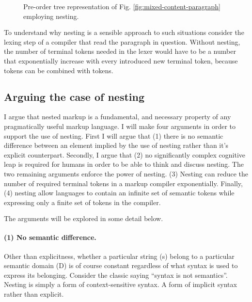 \documentclass{scrreprt}
\begin{document}
\begin{figure}[h]
  \centering

  \caption{Pre-order tree representation of Fig. \ref{fig:mixed-content-paragraph} employing nesting.}
  \label{fig:mixed-content-tree}
\end{figure}



To understand why nesting is a sensible approach to such situations consider the lexing step of a compiler that read the paragraph in question. Without nesting, the number of terminal tokens needed in the lexer would have to be a number that exponentially increase with every introduced new terminal token, because tokens can be combined with tokens.






\subsection{Arguing the case of nesting}
I argue that nested markup is a fundamental, and necessary property of any pragmatically useful markup language. I will make four arguments in order to support the use of nesting. First I will argue that (1) there is no semantic difference between an element implied by the use of nesting rather than it's explicit counterpart. Secondly, I argue that (2) no significantly complex cognitive leap is required for humans in order to be able to think and discuss nesting. The two remaining arguments enforce the power of nesting. (3) Nesting can reduce the number of required terminal tokens in a markup compiler exponentially. Finally, (4) nesting allow languages to contain an infinite set of semantic tokens while expressing only a finite set of tokens in the compiler.

The arguments will be explored in some detail below.



\paragraph{(1) No semantic difference.}
Other than explicitness, whether a particular string (s) belong to a particular semantic domain (D) is of course constant regardless of what syntax is used to express its belonging. Consider the classic saying ``syntax is not semantics''. Nesting is simply a form of context-sensitive syntax. A form of implicit syntax rather than explicit.
\end{document}
